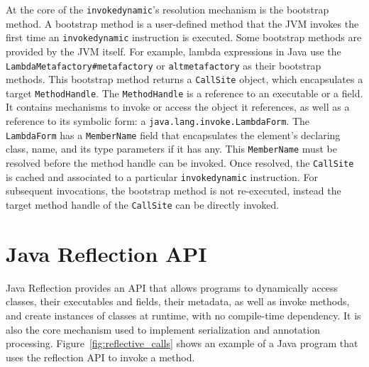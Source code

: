 At the core of the \verb|invokedynamic|'s resolution mechanism is the bootstrap method. A bootstrap method is a user-defined method that the JVM invokes the first time an \verb|invokedynamic| instruction is executed. Some bootstrap methods are provided by the JVM itself. For example, lambda expressions in Java use the \verb|LambdaMetafactory#metafactory| or \verb|altmetafactory| as their bootstrap methods.
This bootstrap method returns a \verb|CallSite| object, which encapsulates a target \verb|MethodHandle|. The \verb|MethodHandle| is a reference to an executable or a field. 
It contains mechanisms to invoke or access the object it references, as well as a reference to its symbolic form: a \verb|java.lang.invoke.LambdaForm|. The \verb|LambdaForm| has a \verb|MemberName| field that encapsulates the element's declaring class, name, and its type parameters if it has any. This \verb|MemberName| must be resolved before the method handle can be invoked. 
Once resolved, the \verb|CallSite| is cached and associated to a particular \verb|invokedynamic| instruction.
For subsequent invocations, the bootstrap method is not re-executed, instead the target method handle of the \verb|CallSite| can be directly invoked.
\section{Java Reflection API}
Java Reflection provides an API that allows programs to dynamically access classes, their executables and fields, their metadata, as well as invoke methods, and create instances of classes at runtime, with no compile-time dependency. It is also the core mechanism used to implement serialization and annotation processing. Figure~\ref{fig:reflective_calls} shows an example of a Java program that uses the reflection API to invoke a method.

